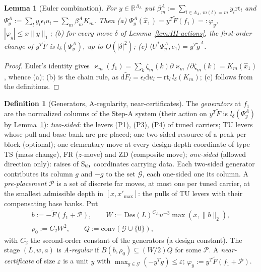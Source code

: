 \documentclass[10pt]{amsart}
\newtheorem{lemma}[theorem]{Lemma}
\theoremstyle{definition}
\newtheorem{definition}[theorem]{Definition}
\theoremstyle{remark}
\newcommand{\R}{\mathbb R}
\newcommand{\ip}[2]{\langle #1,#2\rangle}
\begin{document}
\begin{lemma}[Euler combination]\label{lem:III-Euler}
For $y\in\R^{\Lambda_A}$ put $\beta^A_m:=\sum_{l\in\Lambda_A,\,m(l)=m}y_l
\mathrm{rt}_l$ and $\Psi^A_y:=\sum_ly_l\epsilon_lu_l-\sum_m\beta^A_mK_m$.  Then
\textup{(a)} $\Psi^A_y(\hat x_1)=y^T\tilde F(f_1)=:\varphi_y$, $|\varphi_y|\le
x\|y\|_1$; \textup{(b)} for every move $\delta$ of
Lemma~\textup{\ref{lem:III-actions}}, the first-order change of $y^T\tilde F$ is
$l_\delta(\Psi^A_y)$, up to $O(|\delta|^2)$; \textup{(c)}
$\ip{U^*\Psi^A_y}{e_1}=y^T\tilde g^A$.
\end{lemma}

\begin{proof}
Euler's identity gives $\varkappa_m(f_1)=\sum_k\zeta_m(k)\partial\varkappa_m/
\partial\zeta_m(k)=K_m(\hat x_1)$, whence (a); (b) is the chain rule, as
$\mathrm d\tilde F_l=\epsilon_l\mathrm du_l-\mathrm{rt}_l\,l_\delta(K_m)$; (c)
follows from the definitions.
\end{proof}

\begin{definition}[Generators, A-regularity, near-certificates]\label{def:III-Areg}
The \emph{generators} at $f_1$ are the normalized columns of the Step-A system
(their action on $y^T\tilde F$ is $l_\delta(\Psi^A_y)$ by
Lemma~\ref{lem:III-Euler}):
\emph{two-sided}: the levers (P1), (P3), (P4) of tuned carriers; TU levers
whose pull and base bank are pre-placed; one two-sided resource of a peak per
block (optional); one elementary move at every design-depth coordinate of type
TS (mass change), FR ($z$-move) and ZD (composite move);
\emph{one-sided} (allowed direction only): raises of S$_{\rm th}$ coordinates
carrying data.  Each two-sided generator contributes its column $g$ and $-g$
to the set $\mathcal G$, each one-sided one its column.  A \emph{pre-placement}
$\mathcal P$ is a set of discrete far moves, at most one per tuned carrier, at
the smallest admissible depth in $[x,x'_{\max}]$: the pulls of TU levers with
their compensating base banks.  Put
\begin{gather*}
 b:=-\tilde F(f_1+\mathcal P),\qquad W:=\mathrm{Des}(L)^{C_A}u^{-3}\max(x,\|b\|_2),\\
 \rho_0:=C_2W^2,\qquad Q:=\mathrm{conv}(\mathcal G\cup\{0\}),
\end{gather*}
with $C_2$ the second-order constant of the generators (a design constant).
The stage $(L,w,a)$ is \emph{A-regular} if $B(b,\rho_0)\subseteq(W/2)Q$ for some
$\mathcal P$.  A \emph{near-certificate} of size $\varepsilon$ is a unit
$y$ with $\max_{g\in\mathcal G}(-y^Tg)\le\varepsilon$; $\varphi_y:=
y^T\tilde F(f_1+\mathcal P)$.
\end{definition}
\end{document}
